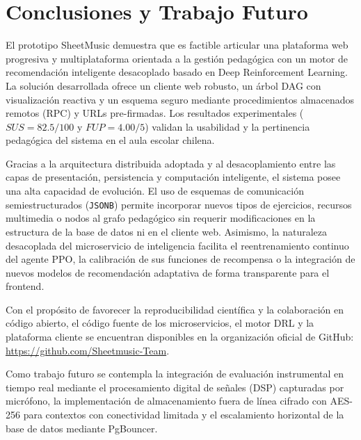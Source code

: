 \section{Conclusiones y Trabajo Futuro}

El prototipo SheetMusic demuestra que es factible articular una plataforma web progresiva y multiplataforma orientada a la gestión pedagógica con un motor de recomendación inteligente desacoplado basado en Deep Reinforcement Learning. La solución desarrollada ofrece un cliente web robusto, un árbol DAG con visualización reactiva y un esquema seguro mediante procedimientos almacenados remotos (RPC) y URLs pre-firmadas. Los resultados experimentales ($SUS = 82.5/100$ y $FUP = 4.00/5$) validan la usabilidad y la pertinencia pedagógica del sistema en el aula escolar chilena.

Gracias a la arquitectura distribuida adoptada y al desacoplamiento entre las capas de presentación, persistencia y computación inteligente, el sistema posee una alta capacidad de evolución. El uso de esquemas de comunicación semiestructurados (\texttt{JSONB}) permite incorporar nuevos tipos de ejercicios, recursos multimedia o nodos al grafo pedagógico sin requerir modificaciones en la estructura de la base de datos ni en el cliente web. Asimismo, la naturaleza desacoplada del microservicio de inteligencia facilita el reentrenamiento continuo del agente PPO, la calibración de sus funciones de recompensa o la integración de nuevos modelos de recomendación adaptativa de forma transparente para el frontend.

Con el propósito de favorecer la reproducibilidad científica y la colaboración en código abierto, el código fuente de los microservicios, el motor DRL y la plataforma cliente se encuentran disponibles en la organización oficial de GitHub: \url{https://github.com/Sheetmusic-Team}.

Como trabajo futuro se contempla la integración de evaluación instrumental en tiempo real mediante el procesamiento digital de señales (DSP) capturadas por micrófono, la implementación de almacenamiento fuera de línea cifrado con AES-256 para contextos con conectividad limitada y el escalamiento horizontal de la base de datos mediante PgBouncer. 